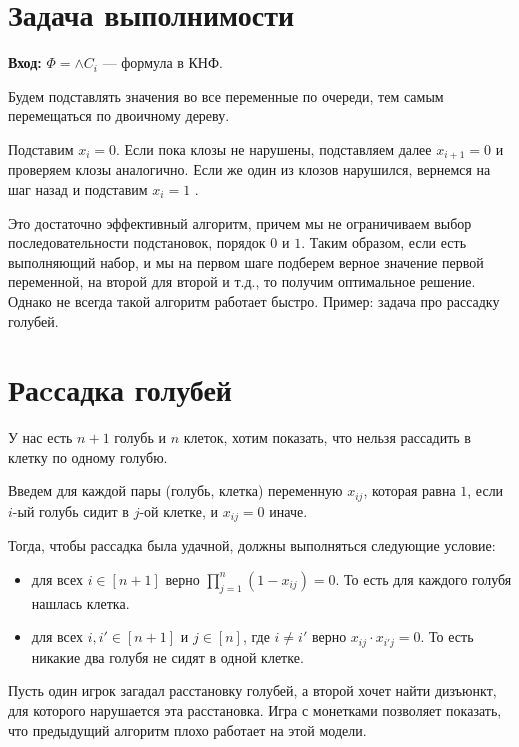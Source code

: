 \section{Задача выполнимости}
\textbf{Вход:} $ \Phi = \wedge C_i $  --- формула в КНФ.

Будем подставлять значения во все переменные по очереди, тем самым перемещаться по двоичному дереву.

Подставим $ x_i = 0$. Если пока клозы не нарушены, подставляем далее $ x_{i+1} = 0$ и проверяем клозы аналогично. Если же один из клозов нарушился, вернемся на шаг назад и подставим $  x_i = 1$ .

\begin{figure}[ht]
    \centering
    \label{fig:cnf-algo}
\end{figure}

Это достаточно эффективный алгоритм, причем мы не ограничиваем выбор последовательности подстановок, порядок $ 0$ и $ 1$. Таким образом, если есть выполняющий набор, и мы на первом шаге подберем верное значение первой переменной, на второй для второй и т.д., то получим оптимальное решение. Однако не всегда такой алгоритм работает быстро. Пример: задача про рассадку голубей.

\section{Раcсадка голубей}
У нас есть $n+1$ голубь и $n$ клеток, хотим показать, что нельзя рассадить в клетку по одному голубю.

Введем для каждой пары (голубь, клетка) переменную $ x_{ij}$, которая равна $ 1$, если $ i$-ый голубь сидит в $ j$-ой клетке, и $ x_{ij} = 0$ иначе.

Тогда, чтобы рассадка была удачной, должны выполняться следующие условие: 
\begin{itemize}
	\item для всех $i \in [n+1]$ верно $ \prod_{j=1}^{n} (1-x_{ij}) = 0$. То есть для каждого голубя нашлась клетка.
	\item для всех $ i, i'\in [n+1]$ и $ j \in [n]$, где  $ i \ne i'$ верно $x_{ij} \cdot x_{i'j} = 0$. То есть никакие два голубя не сидят в одной клетке.
\end{itemize}
Пусть один игрок загадал расстановку голубей, а второй хочет найти дизъюнкт, для которого нарушается эта расстановка. 
Игра с монетками позволяет показать, что предыдущий алгоритм плохо работает на этой модели.

